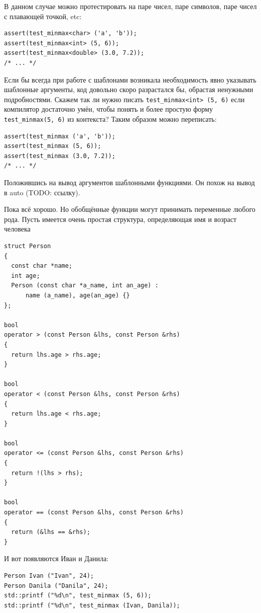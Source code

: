 \documentclass[a4paper,12pt,oneside]{article}
\begin{document}
В данном случае можно протестировать на паре чисел, паре символов, паре чисел с плавающей точкой, etc:

\begin{lstlisting}
assert(test_minmax<char> ('a', 'b'));
assert(test_minmax<int> (5, 6));
assert(test_minmax<double> (3.0, 7.2));
/* ... */
\end{lstlisting}

Если бы всегда при работе с шаблонами возникала необходимость явно указывать шаблонные аргументы, код довольно скоро разрастался бы, обрастая ненужными подробностями. Скажем так ли нужно писать \lstinline!test_minmax<int> (5, 6)! если компилятор достаточно умён, чтобы понять и более простую форму \lstinline!test_minmax(5, 6)! из контекста? Таким образом можно переписать:

\begin{lstlisting}
assert(test_minmax ('a', 'b'));
assert(test_minmax (5, 6));
assert(test_minmax (3.0, 7.2));
/* ... */
\end{lstlisting}
 
Положившись на вывод аргументов шаблонными функциями. Он похож на вывод в auto (TODO: ссылку).

Пока всё хорошо. Но обобщённые функции могут принимать переменные любого рода. Пусть имеется очень простая структура, определяющая имя и возраст человека

\begin{lstlisting}
struct Person
{
  const char *name;
  int age;
  Person (const char *a_name, int an_age) : 
      name (a_name), age(an_age) {}
};

bool
operator > (const Person &lhs, const Person &rhs)
{
  return lhs.age > rhs.age;
}

bool
operator < (const Person &lhs, const Person &rhs)
{
  return lhs.age < rhs.age;
}

bool
operator <= (const Person &lhs, const Person &rhs)
{
  return !(lhs > rhs);
}

bool
operator == (const Person &lhs, const Person &rhs)
{
  return (&lhs == &rhs);
}
\end{lstlisting}

И вот появляются Иван и Данила:

\begin{lstlisting}
Person Ivan ("Ivan", 24);
Person Danila ("Danila", 24);
std::printf ("%d\n", test_minmax (5, 6));
std::printf ("%d\n", test_minmax (Ivan, Danila));
\end{lstlisting}
\end{document}
